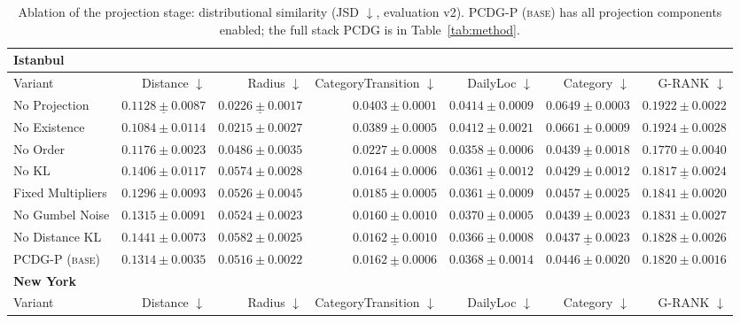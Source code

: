 \begin{table}[t]
\centering
\footnotesize
\setlength{\tabcolsep}{3pt}
\caption{Ablation of the projection stage: distributional similarity (JSD $\downarrow$, evaluation v2).
\textsc{PCDG-P (base)} has all projection components enabled; the full stack \textsc{PCDG} is in Table~\ref{tab:method}.}
\label{tab:ablation-jsd}
\begin{tabular}{lrrrrrr}
\toprule
\multicolumn{7}{l}{\textbf{Istanbul}} \\
\midrule
Variant & Distance $\downarrow$ & Radius $\downarrow$ & CategoryTransition $\downarrow$ & DailyLoc $\downarrow$ & Category $\downarrow$ & G-RANK $\downarrow$ \\
\midrule
No Projection & $\underline{0.1128\pm 0.0087}$ & $\underline{0.0226\pm 0.0017}$ & $0.0403\pm 0.0001$ & $0.0414\pm 0.0009$ & $0.0649\pm 0.0003$ & $0.1922\pm 0.0022$ \\
No Existence & $\mathbf{0.1084\pm 0.0114}$ & $\mathbf{0.0215\pm 0.0027}$ & $0.0389\pm 0.0005$ & $0.0412\pm 0.0021$ & $0.0661\pm 0.0009$ & $0.1924\pm 0.0028$ \\
No Order & $0.1176\pm 0.0023$ & $0.0486\pm 0.0035$ & $0.0227\pm 0.0008$ & $\mathbf{0.0358\pm 0.0006}$ & $\underline{0.0439\pm 0.0018}$ & $\mathbf{0.1770\pm 0.0040}$ \\
No KL & $0.1406\pm 0.0117$ & $0.0574\pm 0.0028$ & $0.0164\pm 0.0006$ & $\underline{0.0361\pm 0.0012}$ & $\mathbf{0.0429\pm 0.0012}$ & $\underline{0.1817\pm 0.0024}$ \\
Fixed Multipliers & $0.1296\pm 0.0093$ & $0.0526\pm 0.0045$ & $0.0185\pm 0.0005$ & $0.0361\pm 0.0009$ & $0.0457\pm 0.0025$ & $0.1841\pm 0.0020$ \\
No Gumbel Noise & $0.1315\pm 0.0091$ & $0.0524\pm 0.0023$ & $\mathbf{0.0160\pm 0.0010}$ & $0.0370\pm 0.0005$ & $0.0439\pm 0.0023$ & $0.1831\pm 0.0027$ \\
No Distance KL & $0.1441\pm 0.0073$ & $0.0582\pm 0.0025$ & $\underline{0.0162\pm 0.0010}$ & $0.0366\pm 0.0008$ & $\underline{0.0437\pm 0.0023}$ & $0.1828\pm 0.0026$ \\
\textsc{PCDG-P (base)} & $0.1314\pm 0.0035$ & $0.0516\pm 0.0022$ & $\underline{0.0162\pm 0.0006}$ & $0.0368\pm 0.0014$ & $0.0446\pm 0.0020$ & $0.1820\pm 0.0016$ \\
\midrule
\multicolumn{7}{l}{\textbf{New York}} \\
\midrule
Variant & Distance $\downarrow$ & Radius $\downarrow$ & CategoryTransition $\downarrow$ & DailyLoc $\downarrow$ & Category $\downarrow$ & G-RANK $\downarrow$ \\

\end{tabular}
\end{table}
